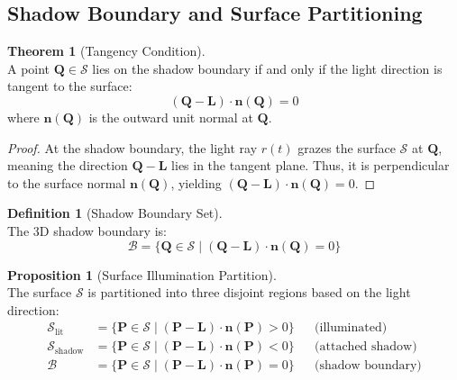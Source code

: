 \documentclass[12pt]{article}
\newcommand{\vect}[1]{\bm{#1}}
\theoremstyle{definition}
\newtheorem{definition}{Definition}[subsection]
\newtheorem{theorem}{Theorem}[subsection]
\newtheorem{proposition}{Proposition}[subsection]
\begin{document}
\subsection{Shadow Boundary and Surface Partitioning}

\begin{theorem}[Tangency Condition] ~\\
A point $\vect{Q} \in \mathcal{S}$ lies on the shadow boundary if and only if the light direction is tangent to the surface:
\begin{equation}
\boxed{(\vect{Q} - \vect{L}) \cdot \vect{n}(\vect{Q}) = 0} \label{eq:tangency}
\end{equation}
where $\vect{n}(\vect{Q})$ is the outward unit normal at $\vect{Q}$.
\end{theorem}

\begin{proof}
At the shadow boundary, the light ray $r(t)$ grazes the surface $\mathcal{S}$ at $\vect{Q}$, meaning the direction $\vect{Q} - \vect{L}$ lies in the tangent plane. Thus, it is perpendicular to the surface normal $\vect{n}(\vect{Q})$, yielding $(\vect{Q} - \vect{L}) \cdot \vect{n}(\vect{Q}) = 0$.
\end{proof}

\begin{definition}[Shadow Boundary Set] ~\\
The 3D shadow boundary is:
\begin{equation}
\boxed{\mathcal{B} = \{\vect{Q} \in \mathcal{S} \mid (\vect{Q} - \vect{L}) \cdot \vect{n}(\vect{Q}) = 0\}} \label{eq:boundary_set}
\end{equation}
\end{definition}

\newpage

\begin{proposition}[Surface Illumination Partition] ~\\
The surface $\mathcal{S}$ is partitioned into three disjoint regions based on the light direction:
\begin{align}
\mathcal{S}_{\text{lit}} &= \{\vect{P} \in \mathcal{S} \mid (\vect{P} - \vect{L}) \cdot \vect{n}(\vect{P}) > 0\} && \text{(illuminated)} \label{eq:lit_region} \\
\mathcal{S}_{\text{shadow}} &= \{\vect{P} \in \mathcal{S} \mid (\vect{P} - \vect{L}) \cdot \vect{n}(\vect{P}) < 0\} && \text{(attached shadow)} \label{eq:shadow_region} \\
\mathcal{B} &= \{\vect{P} \in \mathcal{S} \mid (\vect{P} - \vect{L}) \cdot \vect{n}(\vect{P}) = 0\} && \text{(shadow boundary)} \label{eq:boundary_region}
\end{align}
\end{proposition}
\end{document}
